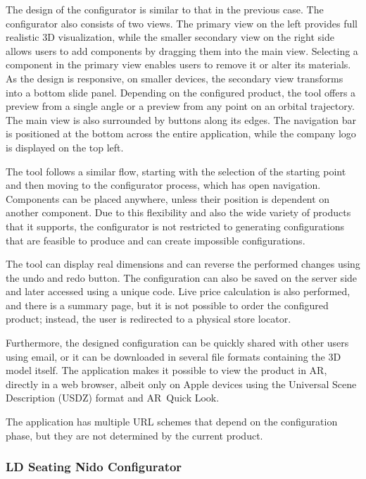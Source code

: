 The design of the configurator is similar to that in the previous case. The configurator also consists of two views. The primary view on the left provides full realistic 3D visualization, while the smaller secondary view on the right side allows users to add components by dragging them into the main view. Selecting a component in the primary view enables users to remove it or alter its materials. As the design is responsive, on smaller devices, the secondary view transforms into a bottom slide panel. Depending on the configured product, the tool offers a preview from a single angle or a preview from any point on an orbital trajectory. The main view is also surrounded by buttons along its edges. The navigation bar is positioned at the bottom across the entire application, while the company logo is displayed on the top left.

The tool follows a similar flow, starting with the selection of the starting point and then moving to the configurator process, which has open navigation. Components can be placed anywhere, unless their position is dependent on another component. Due to this flexibility and also the wide variety of products that it supports, the configurator is not restricted to generating configurations that are feasible to produce and can create impossible configurations.

The tool can display real dimensions and can reverse the performed changes using the undo and redo button. The configuration can also be saved on the server side and later accessed using a unique code. Live price calculation is also performed, and there is a summary page, but it is not possible to order the configured product; instead, the user is redirected to a physical store locator.

Furthermore, the designed configuration can be quickly shared with other users using email, or it can be downloaded in several file formats containing the 3D model itself. The application makes it possible to view the product in AR, directly in a web browser, albeit only on Apple devices using the Universal Scene Description (USDZ) format and AR~Quick Look. \cite{Jackson2018}

The application has multiple URL schemes that depend on the configuration phase, but they are not determined by the current product. 

\subsubsection{LD Seating Nido Configurator}

